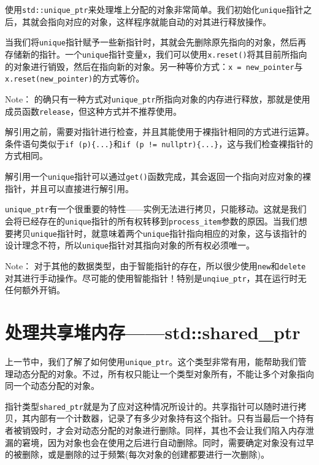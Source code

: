 
使用\texttt{std::unique\_ptr}来处理堆上分配的对象非常简单。我们初始化\texttt{unique}指针之后，其就会指向对应的对象，这样程序就能自动的对其进行释放操作。

当我们将\texttt{unique}指针赋予一些新指针时，其就会先删除原先指向的对象，然后再存储新的指针。一个\texttt{unique}指针变量\texttt{x}，我们可以使用\texttt{x.reset()}将其目前所指向的对象进行销毁，然后在指向新的对象。另一种等价方式：\texttt{x = new\_pointer}与\texttt{x.reset(new\_pointer)}的方式等价。

\begin{myInfoBox}
Note： 的确只有一种方式对\texttt{unique\_ptr}所指向对象的内存进行释放，那就是使用成员函数\texttt{release}，但这种方式并不推荐使用。
\end{myInfoBox}

解引用之前，需要对指针进行检查，并且其能使用于裸指针相同的方式进行运算。条件语句类似于\texttt{if (p)\{...\}}和\texttt{if (p != nullptr)\{...\}}，这与我们检查裸指针的方式相同。

解引用一个\texttt{unique}指针可以通过\texttt{get()}函数完成，其会返回一个指向对应对象的裸指针，并且可以直接进行解引用。

\texttt{unique\_ptr}有一个很重要的特性——实例无法进行拷贝，只能移动。这就是我们会将已经存在的\texttt{unique}指针的所有权转移到\texttt{process\_item}参数的原因。当我们想要拷贝\texttt{unique}指针时，就意味着两个\texttt{unique}指针指向相应的对象，这与该指针的设计理念不符，所以\texttt{unique}指针对其指向对象的所有权必须唯一。

\begin{myInfoBox}
Note： 对于其他的数据类型，由于智能指针的存在，所以很少使用\texttt{new}和\texttt{delete}对其进行手动操作。尽可能的使用智能指针！特别是\texttt{unqiue\_ptr}，其在运行时无任何额外开销。
\end{myInfoBox}


\section{处理共享堆内存——std::shared\_ptr}

上一节中，我们了解了如何使用\texttt{unique\_ptr}。这个类型非常有用，能帮助我们管理动态分配的对象。不过，所有权只能让一个类型对象所有，不能让多个对象指向同一个动态分配的对象。

指针类型\texttt{shared\_ptr}就是为了应对这种情况所设计的。共享指针可以随时进行拷贝，其内部有一个计数器，记录了有多少对象持有这个指针。只有当最后一个持有者被销毁时，才会对动态分配的对象进行删除。同样，其也不会让我们陷入内存泄漏的窘境，因为对象也会在使用之后进行自动删除。同时，需要确定对象没有过早的被删除，或是删除的过于频繁(每次对象的创建都要进行一次删除)。

